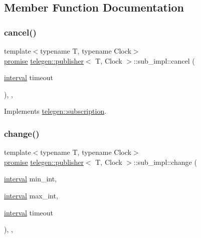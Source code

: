 \subsection{Member Function Documentation}
\mbox{\label{classtelegen_1_1publisher_1_1sub__impl_ae0a84e8e0a45d21c688ee557c603c43d}} 
\subsubsection{\texorpdfstring{cancel()}{cancel()}}
{\footnotesize\ttfamily template$<$typename T, typename Clock$>$ \\
\hyperlink{namespacetelegen_a9dd802bb5d30cf96b0c616750d43ae86}{promise} \hyperlink{classtelegen_1_1publisher}{telegen\+::publisher}$<$ T, Clock $>$\+::sub\+\_\+impl\+::cancel (\begin{DoxyParamCaption}\item[{\hyperlink{namespacetelegen_ad925de2d0a99bc43918533abf0457344}{interval}}]{timeout }\end{DoxyParamCaption})\hspace{0.3cm}{\ttfamily [inline]}, {\ttfamily [override]}, {\ttfamily [virtual]}}



Implements \hyperlink{classtelegen_1_1subscription_a7d645e1bf76477316d9f868a69467e42}{telegen\+::subscription}.

\mbox{\label{classtelegen_1_1publisher_1_1sub__impl_a2144a27beee3ef15a21fb7fd323b3770}} 
\subsubsection{\texorpdfstring{change()}{change()}}
{\footnotesize\ttfamily template$<$typename T, typename Clock$>$ \\
\hyperlink{namespacetelegen_a9dd802bb5d30cf96b0c616750d43ae86}{promise} \hyperlink{classtelegen_1_1publisher}{telegen\+::publisher}$<$ T, Clock $>$\+::sub\+\_\+impl\+::change (\begin{DoxyParamCaption}\item[{\hyperlink{namespacetelegen_ad925de2d0a99bc43918533abf0457344}{interval}}]{min\+\_\+int,  }\item[{\hyperlink{namespacetelegen_ad925de2d0a99bc43918533abf0457344}{interval}}]{max\+\_\+int,  }\item[{\hyperlink{namespacetelegen_ad925de2d0a99bc43918533abf0457344}{interval}}]{timeout }\end{DoxyParamCaption})\hspace{0.3cm}{\ttfamily [inline]}, {\ttfamily [override]}, {\ttfamily [virtual]}}



